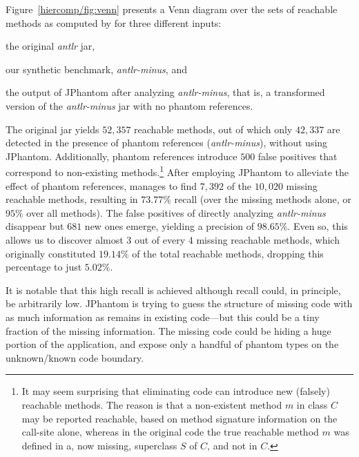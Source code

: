 \begin{itemize}[--]
  Figure~\ref{hiercomp/fig:venn} presents a Venn diagram over the sets of
  reachable methods as computed by \doop{} for three different
  inputs:
  \begin{inparaenum}[(i)]
  \item the original \emph{antlr} jar,
  \item our synthetic benchmark, \emph{antlr-minus}, and
  \item the output of JPhantom after analyzing \emph{antlr-minus},
    that is, a transformed version of the \emph{antlr-minus} jar with
    no phantom references.
  \end{inparaenum}
  The original jar yields $52,357$ reachable methods, out of which
  only $42,337$ are detected in the presence of phantom references
  (\emph{antlr-minus}), without using JPhantom. Additionally, phantom
  references introduce $500$ false positives that correspond to
  non-existing methods.\footnote{It may seem surprising that
    eliminating code can introduce new (falsely) reachable
    methods. The reason is that a non-existent method $m$ in class $C$
    may be reported reachable, based on method signature information
    on the call-site alone, whereas in the original code the true
    reachable method $m$ was defined in a, now missing, superclass $S$
    of $C$, and not in $C$.} After employing JPhantom to alleviate the
  effect of phantom references, \doop{} manages to find $7,392$ of the
  $10,020$ missing reachable methods, resulting in $73.77\%$ recall
  (over the missing methods alone, or $95\%$ over all methods). The
  false positives of directly analyzing \emph{antlr-minus} disappear
  but $681$ new ones emerge, yielding a precision of $98.65\%$. Even
  so, this allows us to discover almost 3 out of every 4 missing
  reachable methods, which originally constituted $19.14\%$ of the
  total reachable methods, dropping this percentage to just $5.02\%$.

  It is notable that this high recall is achieved although recall
  could, in principle, be arbitrarily low. JPhantom is trying to guess
  the structure of missing code with as much information as remains in
  existing code---but this could be a tiny fraction of the missing
  information. The missing code could be hiding a huge portion of the
  application, and expose only a handful of phantom types on the
  unknown/known code boundary.

\end{itemize}

